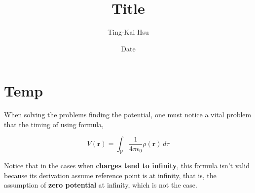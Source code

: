 \documentclass[12pt]{article}
\title{Title}
\author{Ting-Kai Hsu}
\date{Date}
\begin{document}
\section{Temp}
When solving the problems finding the potential, one must notice a vital problem that the timing of using formula,

\begin{center}
    \[ V(\mathbf{r}) = \int_{\mathcal{V}} \frac{1}{4 \pi \epsilon_0 }\rho(\mathbf{r}) \, d\tau \]
\end{center}

Notice that in the cases when \textbf{charges tend to infinity}, this formula isn't valid because its derivation assume reference point is at infinity, that is, the assumption of \textbf{zero potential} at infinity, which is not the case.
\end{document}
